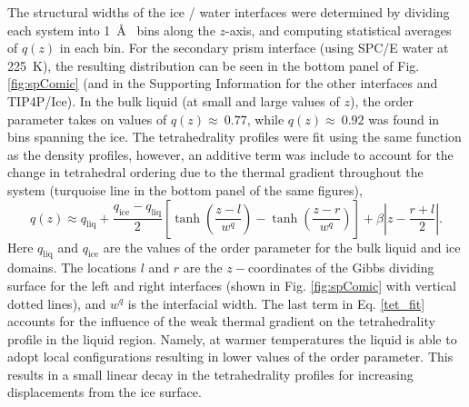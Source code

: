 The structural widths of the ice / water interfaces were determined by
dividing each system into 1~\AA~ bins along the $z$-axis, and
computing statistical averages of $q(z)$ in each bin. For the
secondary prism interface (using SPC/E water at 225~K), the resulting
distribution can be seen in the bottom panel of Fig. \ref{fig:spComic}
(and in the Supporting Information for the other interfaces and
TIP4P/Ice). In the bulk liquid (at small and large values of $z$), the
order parameter takes on values of $q(z) \approx~0.77$, while
$q(z) \approx~0.92$ was found in bins spanning the ice. The
tetrahedrality profiles were fit using the same function as the
density profiles, however, an additive term was include to account for
the change in tetrahedral ordering due to the thermal gradient
throughout the system (turquoise line in the
bottom panel of the same figures),
\begin{equation}\label{tet_fit}
q(z) \approx
q_\mathrm{liq}+\frac{q_\mathrm{ice}-q_\mathrm{liq}}{2}\left[\tanh\left(\frac{z-l}{w^q}\right)-\tanh\left(\frac{z-r}{w^q}\right)\right]+\beta\left|z-\frac{r+l}{2}\right|.
\end{equation}
Here $q_\mathrm{liq}$ and $q_\mathrm{ice}$ are the values of the order
parameter for the bulk liquid and ice domains. The locations $l$ and
$r$ are the $z-$coordinates of the Gibbs dividing surface for the left
and right interfaces (shown in Fig. \ref{fig:spComic} with vertical
dotted lines), and $w^{q}$ is the interfacial width.  The last term in
Eq. \eqref{tet_fit} accounts for the influence of the weak thermal
gradient on the tetrahedrality profile in the liquid region. Namely,
at warmer temperatures the liquid is able to adopt local
configurations resulting in lower values of the order parameter. This
results in a small linear decay in the tetrahedrality profiles for
increasing displacements from the ice surface.

